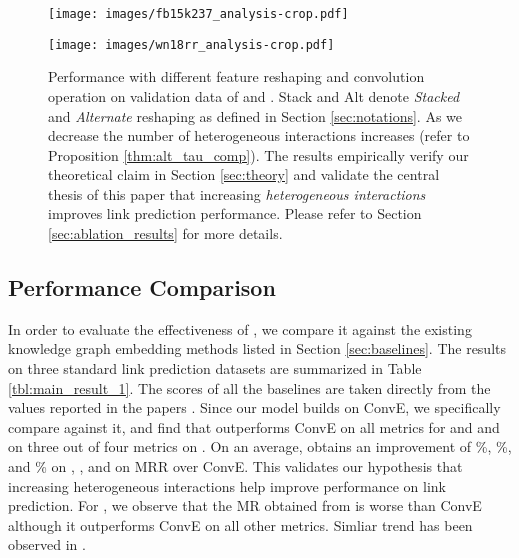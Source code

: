 \documentclass[11pt,a4paper]{article}
\begin{document}
\begin{figure*}[t!]
	\begin{minipage}{0.49\linewidth}
		\centering
		\texttt{[image: images/fb15k237\_analysis-crop.pdf]}
	\end{minipage}
	\hfill
	\begin{minipage}{0.49\linewidth}
		\centering
		\texttt{[image: images/wn18rr\_analysis-crop.pdf]}
	\end{minipage}
	\caption{\label{fig:fact_analysis}Performance with different feature reshaping and convolution operation on validation data of \datafbn{} and \datawnn{}. Stack and Alt denote \textit{Stacked} and \textit{Alternate} reshaping as defined in Section \ref{sec:notations}. As we decrease  the number of heterogeneous interactions increases (refer to Proposition \ref{thm:alt_tau_comp}). The results empirically verify our theoretical claim in Section \ref{sec:theory} and validate the central thesis of this paper that increasing \textit{heterogeneous interactions} improves link prediction performance. Please refer to Section \ref{sec:ablation_results} for more details.}
\end{figure*}


\subsection{Performance Comparison}
\label{sec:main_results}


In order to evaluate the effectiveness of \method{}, we compare it against the existing knowledge graph embedding methods listed in Section \ref{sec:baselines}. The results on three standard link prediction datasets are summarized in Table \ref{tbl:main_result_1}. The scores of all the baselines are taken directly from the values reported in the papers \cite{conve,rotate,sacn_paper,kbgan,kblrn}. Since our model builds on ConvE, we specifically compare against it, and find that \method{} outperforms ConvE on all metrics for \datafbn{} and \datawnn{} and on three out of four metrics on \datayago{}. On an average, \method{} obtains an improvement of \%, \%, and \% on \datafbn{}, \datawnn{}, and \datayago{} on MRR over ConvE. This validates our hypothesis that increasing heterogeneous interactions help improve performance on link prediction. For \datayago{}, we observe that the MR obtained from \method{} is worse than ConvE although it outperforms ConvE on all other metrics. Simliar trend has been observed in \cite{conve,rotate}.
\end{document}
